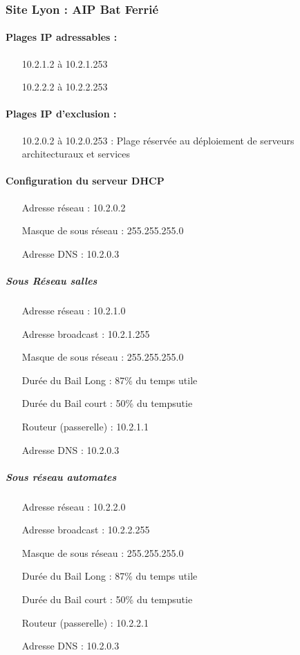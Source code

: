 \documentclass[a4paper]{article}
\begin{document}
\subsubsection{Site Lyon : AIP Bat Ferrié}

\paragraph{Plages IP adressables :} 
\begin{itemize}
\item[10.2.1.2 à 10.2.1.253]
\item[10.2.2.2 à 10.2.2.253]
\end{itemize}

\paragraph{Plages IP d'exclusion :}
\begin{itemize}
\item[10.2.0.2 à 10.2.0.253] : Plage réservée au déploiement de serveurs architecturaux et services
\end{itemize}

\paragraph{Configuration du serveur DHCP}

\begin{itemize}
\item[Adresse réseau]: 10.2.0.2
\item[Masque de sous réseau]: 255.255.255.0
\item[Adresse DNS]: 10.2.0.3
\end{itemize}

\subparagraph{Sous Réseau salles}
\begin{itemize}
\item[Adresse réseau]: 10.2.1.0
\item[Adresse broadcast]: 10.2.1.255
\item[Masque de sous réseau]: 255.255.255.0
\item[Durée du Bail Long]: 87\% du temps utile
\item[Durée du Bail court]: 50\% du tempsutie
\item[Routeur (passerelle)]: 10.2.1.1
\item[Adresse DNS]: 10.2.0.3
\end{itemize}

\subparagraph{Sous réseau automates}
\begin{itemize}
\item[Adresse réseau]: 10.2.2.0
\item[Adresse broadcast]: 10.2.2.255
\item[Masque de sous réseau]: 255.255.255.0
\item[Durée du Bail Long]: 87\% du temps utile
\item[Durée du Bail court]: 50\% du tempsutie
\item[Routeur (passerelle)]: 10.2.2.1
\item[Adresse DNS]: 10.2.0.3
\end{itemize}
\end{document}
